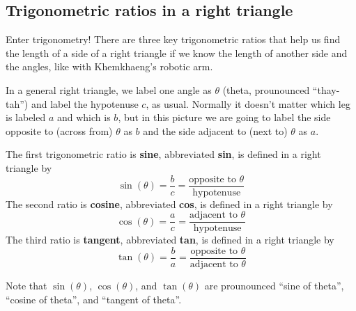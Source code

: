 \subsection*{Trigonometric ratios in a right triangle}

Enter trigonometry!  There are three key trigonometric ratios that help us find the length of a side of a right triangle if we know the length of another side and the angles, like with Khemkhaeng's robotic arm. 

In a general right triangle, we label one angle as $\theta$ (theta, prounounced ``thay-tah'') and label the hypotenuse $c$, as usual.  Normally it doesn't matter which leg is labeled $a$ and which is $b$, but in this picture we are going to label the side opposite to (across from) $\theta$ as $b$ and the side adjacent to (next to) $\theta$ as $a$. 
\begin{center}
\end{center}

The first trigonometric ratio is \textbf{sine}, abbreviated \textbf{sin}, is defined in a right triangle by 
$$\sin(\theta) = \frac{b}{c} = \frac{\text{opposite to } \theta}{\text{hypotenuse}}$$
The second ratio is \textbf{cosine}, abbreviated \textbf{cos}, is defined in a right triangle by 
$$\cos(\theta) = \frac{a}{c} = \frac{\text{adjacent to } \theta}{\text{hypotenuse}}$$
The third ratio is \textbf{tangent}, abbreviated \textbf{tan}, is defined in a right triangle by 
$$\tan(\theta) = \frac{b}{a} = \frac{\text{opposite to } \theta}{\text{adjacent to } \theta}$$ 

Note that $\sin(\theta)$, $\cos(\theta)$, and $\tan(\theta)$ are prounounced ``sine of theta'', ``cosine of theta'', and ``tangent of theta''. 

